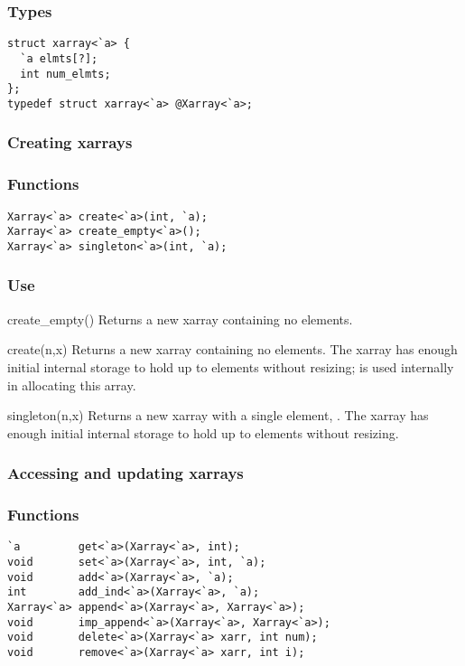 \subsubsection*{Types}
\begin{verbatim}
struct xarray<`a> {
  `a elmts[?];
  int num_elmts;
};
typedef struct xarray<`a> @Xarray<`a>;
\end{verbatim}

\subsubsection*{Creating xarrays}
\subsubsection*{Functions}
\begin{verbatim}
Xarray<`a> create<`a>(int, `a);
Xarray<`a> create_empty<`a>();
Xarray<`a> singleton<`a>(int, `a);
\end{verbatim}

\subsubsection*{Use}

\begin{defun}{create_empty}{()}
Returns a new xarray containing no elements.
\end{defun}

\begin{defun}{create}{(n,x)}
Returns a new xarray containing no elements.  The xarray has enough
initial internal storage to hold up to  elements without
resizing;  is used internally in allocating this array.
\end{defun}

\begin{defun}{singleton}{(n,x)}
Returns a new xarray with a single element, .  The xarray has
enough initial internal storage to hold up to  elements without
resizing.
\end{defun}

\subsubsection*{Accessing and updating xarrays}
\subsubsection*{Functions}
\begin{verbatim}
`a         get<`a>(Xarray<`a>, int);
void       set<`a>(Xarray<`a>, int, `a);
void       add<`a>(Xarray<`a>, `a);
int        add_ind<`a>(Xarray<`a>, `a);
Xarray<`a> append<`a>(Xarray<`a>, Xarray<`a>);
void       imp_append<`a>(Xarray<`a>, Xarray<`a>);
void       delete<`a>(Xarray<`a> xarr, int num);
void       remove<`a>(Xarray<`a> xarr, int i);
\end{verbatim}


